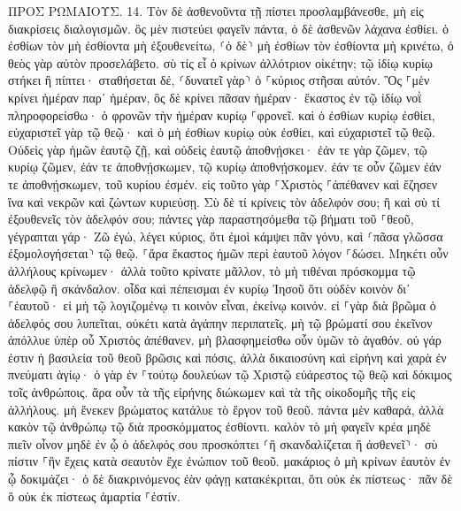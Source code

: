 \documentclass[twoside, 9pt]{extreport}
\begin{document}
ΠΡΟΣ ΡΩΜΑΙΟΥΣ.
14.
Τὸν δὲ ἀσθενοῦντα τῇ πίστει προσλαμβάνεσθε, μὴ εἰς διακρίσεις διαλογισμῶν. 
ὃς μὲν πιστεύει φαγεῖν πάντα, ὁ δὲ ἀσθενῶν λάχανα ἐσθίει. 
ὁ ἐσθίων τὸν μὴ ἐσθίοντα μὴ ἐξουθενείτω, ⸂ὁ δὲ⸃ μὴ ἐσθίων τὸν ἐσθίοντα μὴ κρινέτω, ὁ θεὸς γὰρ αὐτὸν προσελάβετο. 
σὺ τίς εἶ ὁ κρίνων ἀλλότριον οἰκέτην; τῷ ἰδίῳ κυρίῳ στήκει ἢ πίπτει· σταθήσεται δέ, ⸂δυνατεῖ γὰρ⸃ ὁ ⸀κύριος στῆσαι αὐτόν. 
Ὃς ⸀μὲν κρίνει ἡμέραν παρ᾽ ἡμέραν, ὃς δὲ κρίνει πᾶσαν ἡμέραν· ἕκαστος ἐν τῷ ἰδίῳ νοῒ πληροφορείσθω· 
ὁ φρονῶν τὴν ἡμέραν κυρίῳ ⸀φρονεῖ. καὶ ὁ ἐσθίων κυρίῳ ἐσθίει, εὐχαριστεῖ γὰρ τῷ θεῷ· καὶ ὁ μὴ ἐσθίων κυρίῳ οὐκ ἐσθίει, καὶ εὐχαριστεῖ τῷ θεῷ. 
Οὐδεὶς γὰρ ἡμῶν ἑαυτῷ ζῇ, καὶ οὐδεὶς ἑαυτῷ ἀποθνῄσκει· 
ἐάν τε γὰρ ζῶμεν, τῷ κυρίῳ ζῶμεν, ἐάν τε ἀποθνῄσκωμεν, τῷ κυρίῳ ἀποθνῄσκομεν. ἐάν τε οὖν ζῶμεν ἐάν τε ἀποθνῄσκωμεν, τοῦ κυρίου ἐσμέν. 
εἰς τοῦτο γὰρ ⸀Χριστὸς ⸀ἀπέθανεν καὶ ἔζησεν ἵνα καὶ νεκρῶν καὶ ζώντων κυριεύσῃ. 
Σὺ δὲ τί κρίνεις τὸν ἀδελφόν σου; ἢ καὶ σὺ τί ἐξουθενεῖς τὸν ἀδελφόν σου; πάντες γὰρ παραστησόμεθα τῷ βήματι τοῦ ⸀θεοῦ, 
γέγραπται γάρ· Ζῶ ἐγώ, λέγει κύριος, ὅτι ἐμοὶ κάμψει πᾶν γόνυ, καὶ ⸂πᾶσα γλῶσσα ἐξομολογήσεται⸃ τῷ θεῷ. 
⸀ἄρα ἕκαστος ἡμῶν περὶ ἑαυτοῦ λόγον ⸀δώσει. 
Μηκέτι οὖν ἀλλήλους κρίνωμεν· ἀλλὰ τοῦτο κρίνατε μᾶλλον, τὸ μὴ τιθέναι πρόσκομμα τῷ ἀδελφῷ ἢ σκάνδαλον. 
οἶδα καὶ πέπεισμαι ἐν κυρίῳ Ἰησοῦ ὅτι οὐδὲν κοινὸν δι᾽ ⸀ἑαυτοῦ· εἰ μὴ τῷ λογιζομένῳ τι κοινὸν εἶναι, ἐκείνῳ κοινόν. 
εἰ ⸀γὰρ διὰ βρῶμα ὁ ἀδελφός σου λυπεῖται, οὐκέτι κατὰ ἀγάπην περιπατεῖς. μὴ τῷ βρώματί σου ἐκεῖνον ἀπόλλυε ὑπὲρ οὗ Χριστὸς ἀπέθανεν. 
μὴ βλασφημείσθω οὖν ὑμῶν τὸ ἀγαθόν. 
οὐ γάρ ἐστιν ἡ βασιλεία τοῦ θεοῦ βρῶσις καὶ πόσις, ἀλλὰ δικαιοσύνη καὶ εἰρήνη καὶ χαρὰ ἐν πνεύματι ἁγίῳ· 
ὁ γὰρ ἐν ⸀τούτῳ δουλεύων τῷ Χριστῷ εὐάρεστος τῷ θεῷ καὶ δόκιμος τοῖς ἀνθρώποις. 
ἄρα οὖν τὰ τῆς εἰρήνης διώκωμεν καὶ τὰ τῆς οἰκοδομῆς τῆς εἰς ἀλλήλους. 
μὴ ἕνεκεν βρώματος κατάλυε τὸ ἔργον τοῦ θεοῦ. πάντα μὲν καθαρά, ἀλλὰ κακὸν τῷ ἀνθρώπῳ τῷ διὰ προσκόμματος ἐσθίοντι. 
καλὸν τὸ μὴ φαγεῖν κρέα μηδὲ πιεῖν οἶνον μηδὲ ἐν ᾧ ὁ ἀδελφός σου προσκόπτει ⸂ἢ σκανδαλίζεται ἢ ἀσθενεῖ⸃· 
σὺ πίστιν ⸀ἣν ἔχεις κατὰ σεαυτὸν ἔχε ἐνώπιον τοῦ θεοῦ. μακάριος ὁ μὴ κρίνων ἑαυτὸν ἐν ᾧ δοκιμάζει· 
ὁ δὲ διακρινόμενος ἐὰν φάγῃ κατακέκριται, ὅτι οὐκ ἐκ πίστεως· πᾶν δὲ ὃ οὐκ ἐκ πίστεως ἁμαρτία ⸀ἐστίν. 
\end{document}
